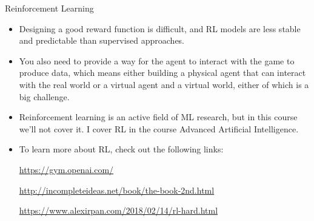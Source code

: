 \documentclass{beamer}
\begin{document}
\begin{frame}{Reinforcement Learning}

\begin{itemize} 
\item Designing a good reward function is difficult, and RL models are less stable and predictable than supervised approaches. 

\item You also need to provide a way for the agent to interact with the game to produce data, which means either building a physical agent that can interact with the real world or a virtual agent and a virtual world, either of which is a big challenge. 
\item Reinforcement learning is an active field of ML research, but in this course we'll not cover it. I cover RL in the course Advanced Artificial Intelligence.

\item To learn more about RL, check out the following links:

\url{https://gym.openai.com/}

\url{http://incompleteideas.net/book/the-book-2nd.html}

\url{https://www.alexirpan.com/2018/02/14/rl-hard.html}

\end{itemize}

\end{frame}
\end{document}
